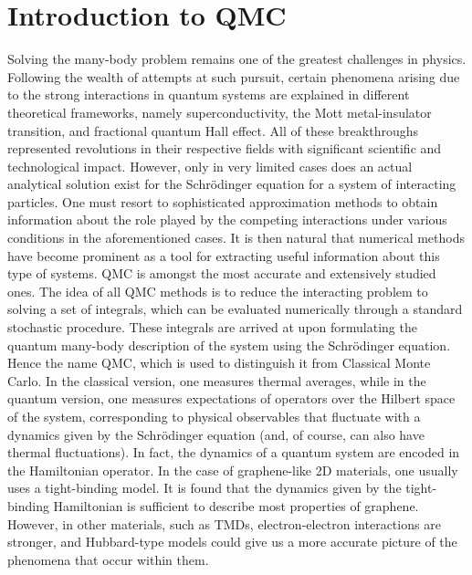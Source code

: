 \section{Introduction to \acl{QMC}}
\label{sec:introQMC}

Solving the many-body problem remains one of the greatest challenges in physics.
Following the wealth of attempts at such pursuit, certain phenomena arising due to the strong interactions in quantum systems are explained in different theoretical frameworks, namely superconductivity, the Mott metal-insulator transition, and fractional quantum Hall effect.
All of these breakthroughs represented revolutions in their respective fields with significant scientific and technological impact.
However, only in very limited cases does an actual analytical solution exist for the  Schr\"odinger equation for a system of interacting particles.
One must resort to sophisticated approximation methods to obtain  information about the role played by the competing interactions under various conditions in the aforementioned cases.
It is then natural that numerical methods have become prominent as a tool for extracting useful information about this type of systems.
\ac{QMC} is amongst the most accurate and extensively studied ones.
The idea of all \ac{QMC} methods is to reduce the interacting problem to solving a set of integrals, which can be evaluated numerically through a standard stochastic procedure.
These integrals are arrived at upon formulating the quantum many-body description of the system using the Schr\"odinger equation.
Hence the name \acl{QMC}, which is used to distinguish it from Classical Monte Carlo.
In the classical version, one measures thermal averages, while in the quantum version, one measures expectations of operators over the Hilbert space of the system, corresponding to physical observables that fluctuate with a dynamics given by the Schr\"odinger equation (and, of course, can also have thermal fluctuations).
In fact, the dynamics of a quantum system are encoded in the Hamiltonian operator.
In the case of graphene-like \ac{2D} materials, one usually uses a tight-binding model.
It is found that the dynamics given by the tight-binding Hamiltonian is sufficient to describe most properties of graphene.
However, in other materials, such as \acp{TMD}, electron-electron interactions are stronger, and Hubbard-type models could give us a more accurate picture of the phenomena that occur within them.

